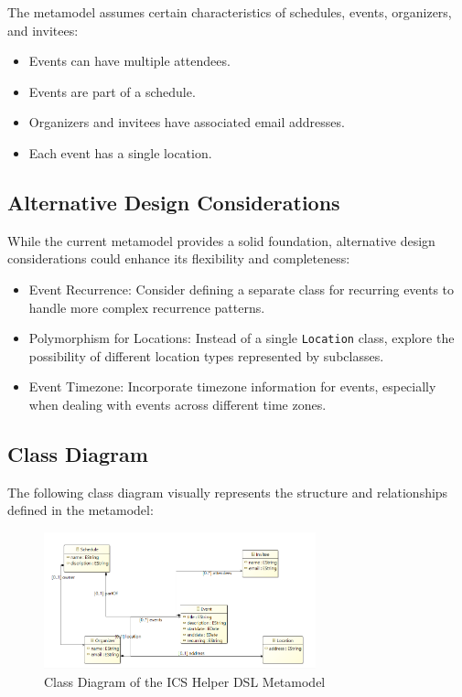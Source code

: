 \documentclass[12pt, letterpaper, twoside]{article}
\begin{document}
The metamodel assumes certain characteristics of schedules, events, organizers, and invitees:

\begin{itemize}
    \item Events can have multiple attendees.
    \item Events are part of a schedule.
    \item Organizers and invitees have associated email addresses.
    \item Each event has a single location.
\end{itemize}

\subsection{Alternative Design Considerations}

While the current metamodel provides a solid foundation, alternative design considerations could enhance its flexibility and completeness:

\begin{itemize}
    \item Event Recurrence: Consider defining a separate class for recurring events to handle more complex recurrence patterns.
    \item Polymorphism for Locations: Instead of a single \texttt{Location} class, explore the possibility of different location types represented by subclasses.
    \item Event Timezone: Incorporate timezone information for events, especially when dealing with events across different time zones.
\end{itemize}

\subsection{Class Diagram}

The following class diagram visually represents the structure and relationships defined in the metamodel:

\begin{figure}[H]
    \centering
    \includegraphics[width=0.7\textwidth]{class.png}
    \caption{Class Diagram of the ICS Helper DSL Metamodel}
    \label{fig:class-diagram}
\end{figure}
\end{document}
